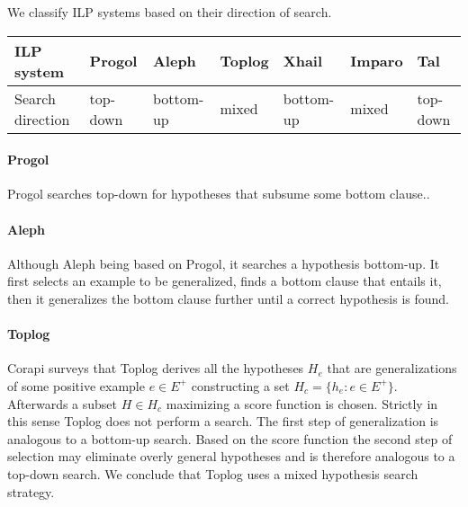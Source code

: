 We classify ILP systems based on their direction of search.

\begin{center}
\label{tab:title} 
\begin{tabular}{| l | l | l | l | l | l | l |}
    \hline
    ILP system & Progol & Aleph & Toplog & Xhail & Imparo & Tal \\ \hline
   	Search direction & top-down & bottom-up& mixed & bottom-up & mixed & top-down\\ \hline
\end{tabular}
\end{center}

\begin{center}
\end{center}

\paragraph{Progol}
Progol searches top-down for hypotheses that subsume some bottom clause.\cite{nienhuys1997foundations}.
\paragraph{Aleph\cite{aleph2007}}
Although Aleph being based on Progol, it searches a hypothesis bottom-up. It first selects an example to be generalized, finds a bottom clause that entails it, then it generalizes the bottom clause further until a correct hypothesis is found.
\paragraph{Toplog\cite{muggleton2008toplog}}
Corapi\cite{corapi2011nonmonotonic} surveys that Toplog derives all the hypotheses $H_e$ that are generalizations of some positive example $e \in E^+$ constructing a set $H_c=\{h_e:e \in E^+\}$.
Afterwards a subset $H \in H_c$ maximizing a score function is chosen. Strictly in this sense Toplog does not perform a search. The first step of generalization is analogous to a bottom-up search. Based on the score function the second step of selection may eliminate overly general hypotheses and is therefore analogous to a top-down search. We conclude that Toplog uses a mixed hypothesis search strategy.
